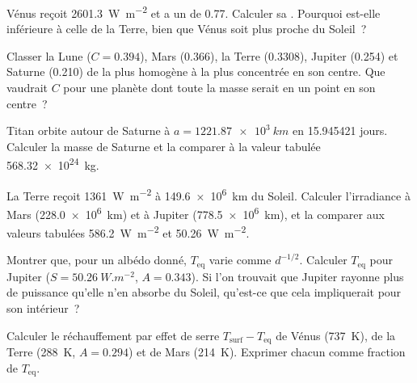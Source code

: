 \begin{exercise}[$\star$]\label{exo:b1:comparative-planetology:3}
Vénus reçoit \qty{2601.3}{W.m^{-2}} et a un  de 0.77. Calculer sa
. Pourquoi est-elle inférieure à celle de la Terre, bien
que Vénus soit plus proche du Soleil~?
\end{exercise}

\begin{exercise}[$\star$]\label{exo:b1:comparative-planetology:4}
Classer la Lune ($C = 0.394$), Mars (0.366), la Terre (0.3308), Jupiter (0.254)
et Saturne (0.210) de la plus homogène à la plus concentrée en son centre. Que
vaudrait $C$ pour une planète dont toute la masse serait en un point en son
centre~?
\end{exercise}

\begin{exercise}[$\star\star$]\label{exo:b1:comparative-planetology:5}
Titan orbite autour de Saturne à $a = \qty{1221.87e3}{km}$ en \num{15.945421}
jours. Calculer la masse de Saturne et la comparer à la valeur tabulée
\qty{568.32e24}{kg}.
\end{exercise}

\begin{exercise}[$\star\star$]\label{exo:b1:comparative-planetology:6}
La Terre reçoit \qty{1361}{W.m^{-2}} à \qty{149.6e6}{km} du Soleil. Calculer
l'irradiance à Mars (\qty{228.0e6}{km}) et à Jupiter (\qty{778.5e6}{km}), et la
comparer aux valeurs tabulées \qty{586.2}{W.m^{-2}} et \qty{50.26}{W.m^{-2}}.
\end{exercise}

\begin{exercise}[$\star\star$]\label{exo:b1:comparative-planetology:7}
Montrer que, pour un albédo donné, $T_\mathrm{eq}$ varie comme $d^{-1/2}$.
Calculer $T_\mathrm{eq}$ pour Jupiter ($S = \qty{50.26}{W.m^{-2}}$, $A = 0.343$).
Si l'on trouvait que Jupiter rayonne plus de puissance qu'elle n'en absorbe du
Soleil, qu'est-ce que cela impliquerait pour son intérieur~?
\end{exercise}

\begin{exercise}[$\star\star$]\label{exo:b1:comparative-planetology:8}
Calculer le réchauffement par effet de serre $T_\mathrm{surf} - T_\mathrm{eq}$
de Vénus (\qty{737}{K}), de la Terre (\qty{288}{K}, $A = 0.294$) et de Mars
(\qty{214}{K}). Exprimer chacun comme fraction de $T_\mathrm{eq}$.
\end{exercise}

